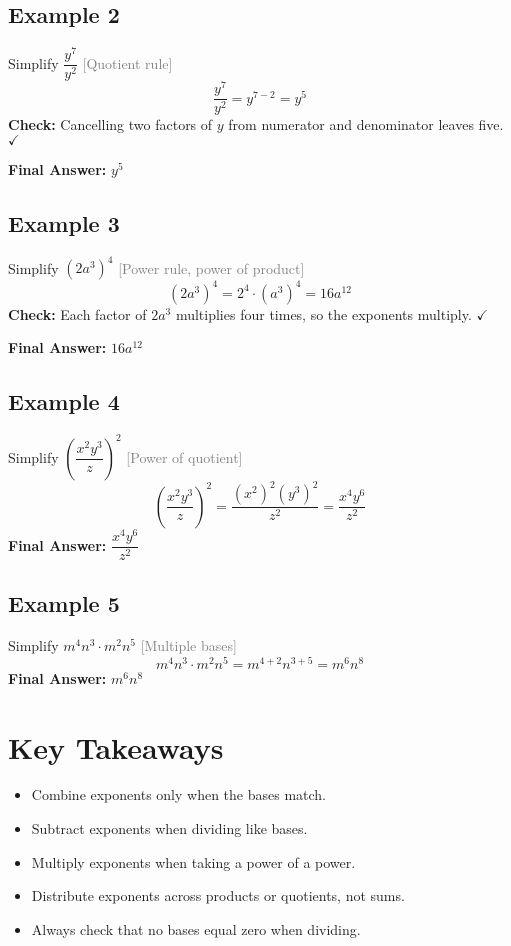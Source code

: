 \documentclass[12pt]{article}
\newcommand{\qtag}[1]{\textcolor{gray}{\footnotesize [#1]}}
\newenvironment{Example}[1]{%
  \subsection*{Example #1}%
}{\vspace{0.25em}}
\begin{document}
\begin{Example}{2}
Simplify \(\dfrac{y^7}{y^2}\) \qtag{Quotient rule}
\[
\dfrac{y^7}{y^2} = y^{7-2} = y^5
\]
\textbf{Check:} Cancelling two factors of \(y\) from numerator and denominator leaves five. \(\checkmark\)

\textbf{Final Answer:} \(\boxed{y^5}\)
\end{Example}

\begin{Example}{3}
Simplify \((2a^3)^4\) \qtag{Power rule, power of product}
\[
(2a^3)^4 = 2^4 \cdot (a^3)^4 = 16a^{12}
\]
\textbf{Check:} Each factor of \(2a^3\) multiplies four times, so the exponents multiply. \(\checkmark\)

\textbf{Final Answer:} \(\boxed{16a^{12}}\)
\end{Example}

\begin{Example}{4}
Simplify \(\left(\dfrac{x^2y^3}{z}\right)^2\) \qtag{Power of quotient}
\[
\left(\dfrac{x^2y^3}{z}\right)^2 = \dfrac{(x^2)^2 (y^3)^2}{z^2} = \dfrac{x^4y^6}{z^2}
\]
\textbf{Final Answer:} \(\boxed{\dfrac{x^4y^6}{z^2}}\)
\end{Example}

\begin{Example}{5}
Simplify \(m^4n^3 \cdot m^2n^5\) \qtag{Multiple bases}
\[
m^4n^3 \cdot m^2n^5 = m^{4+2}n^{3+5} = m^6n^8
\]
\textbf{Final Answer:} \(\boxed{m^6n^8}\)
\end{Example}

\section*{Key Takeaways}
\begin{itemize}
  \item Combine exponents only when the bases match.
  \item Subtract exponents when dividing like bases.
  \item Multiply exponents when taking a power of a power.
  \item Distribute exponents across products or quotients, not sums.
  \item Always check that no bases equal zero when dividing. 
\end{itemize}

\newpage

\end{document}

